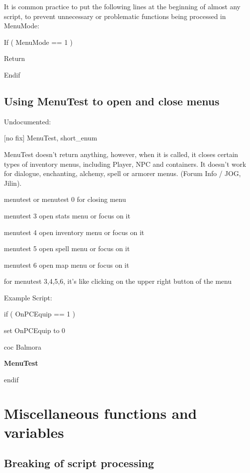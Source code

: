 \documentclass[
]{article}
\begin{document}
It is common practice to put the following lines at the beginning of
almost any script, to prevent unnecessary or problematic functions being
processed in MenuMode:

If ( MenuMode == 1 )

Return

Endif

\hypertarget{using-menutest-to-open-and-close-menus}{%
\subsection{Using MenuTest to open and close
menus}\label{using-menutest-to-open-and-close-menus}}

Undocumented:

{[}no fix{]} MenuTest, short\_enum

MenuTest doesn't return anything, however, when it is called, it closes
certain types of inventory menus, including Player, NPC and containers.
It doesn't work for dialogue, enchanting, alchemy, spell or armorer
menus. (Forum Info / JOG, Jilin).

menutest or menutest 0 for closing menu

menutest 3 open stats menu or focus on it

menutest 4 open inventory menu or focus on it

menutest 5 open spell menu or focus on it

menutest 6 open map menu or focus on it

for menutest 3,4,5,6, it's like clicking on the upper right button of
the menu

Example Script:

if ( OnPCEquip == 1 )

set OnPCEquip to 0

coc Balmora

\textbf{MenuTest}

endif

\hypertarget{miscellaneous-functions-and-variables}{%
\section{\texorpdfstring{\hfill\break
Miscellaneous functions and
variables}{ Miscellaneous functions and variables}}\label{miscellaneous-functions-and-variables}}

\hypertarget{breaking-of-script-processing}{%
\subsection{Breaking of script
processing}\label{breaking-of-script-processing}}
\end{document}
